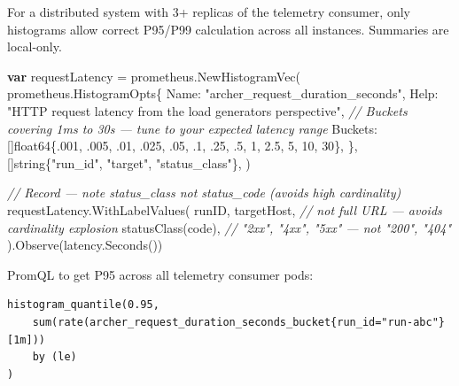 \documentclass[
]{article}
\newenvironment{Shaded}{}{}
\newcommand{\CommentTok}[1]{\textcolor[rgb]{0.38,0.63,0.69}{\textit{#1}}}
\newcommand{\DataTypeTok}[1]{\textcolor[rgb]{0.56,0.13,0.00}{#1}}
\newcommand{\DecValTok}[1]{\textcolor[rgb]{0.25,0.63,0.44}{#1}}
\newcommand{\FloatTok}[1]{\textcolor[rgb]{0.25,0.63,0.44}{#1}}
\newcommand{\KeywordTok}[1]{\textcolor[rgb]{0.00,0.44,0.13}{\textbf{#1}}}
\newcommand{\NormalTok}[1]{#1}
\newcommand{\OperatorTok}[1]{\textcolor[rgb]{0.40,0.40,0.40}{#1}}
\newcommand{\StringTok}[1]{\textcolor[rgb]{0.25,0.44,0.63}{#1}}
\begin{document}
For a distributed system with 3+ replicas of the telemetry consumer,
only histograms allow correct P95/P99 calculation across all instances.
Summaries are local-only.

\begin{Shaded}
\begin{Highlighting}[]
\KeywordTok{var}\NormalTok{ requestLatency }\OperatorTok{=}\NormalTok{ prometheus}\OperatorTok{.}\NormalTok{NewHistogramVec}\OperatorTok{(}
\NormalTok{    prometheus}\OperatorTok{.}\NormalTok{HistogramOpts}\OperatorTok{\{}
\NormalTok{        Name}\OperatorTok{:} \StringTok{"archer\_request\_duration\_seconds"}\OperatorTok{,}
\NormalTok{        Help}\OperatorTok{:} \StringTok{"HTTP request latency from the load generator\textquotesingle{}s perspective"}\OperatorTok{,}
        \CommentTok{// Buckets covering 1ms to 30s — tune to your expected latency range}
\NormalTok{        Buckets}\OperatorTok{:} \OperatorTok{[]}\DataTypeTok{float64}\OperatorTok{\{.}\DecValTok{001}\OperatorTok{,} \OperatorTok{.}\DecValTok{005}\OperatorTok{,} \OperatorTok{.}\DecValTok{01}\OperatorTok{,} \OperatorTok{.}\DecValTok{025}\OperatorTok{,} \OperatorTok{.}\DecValTok{05}\OperatorTok{,} \OperatorTok{.}\DecValTok{1}\OperatorTok{,} \OperatorTok{.}\DecValTok{25}\OperatorTok{,} \OperatorTok{.}\DecValTok{5}\OperatorTok{,} \DecValTok{1}\OperatorTok{,} \DecValTok{2}\FloatTok{.5}\OperatorTok{,} \DecValTok{5}\OperatorTok{,} \DecValTok{10}\OperatorTok{,} \DecValTok{30}\OperatorTok{\},}
    \OperatorTok{\},}
    \OperatorTok{[]}\DataTypeTok{string}\OperatorTok{\{}\StringTok{"run\_id"}\OperatorTok{,} \StringTok{"target"}\OperatorTok{,} \StringTok{"status\_class"}\OperatorTok{\},}
\OperatorTok{)}

\CommentTok{// Record — note status\_class not status\_code (avoids high cardinality)}
\NormalTok{requestLatency}\OperatorTok{.}\NormalTok{WithLabelValues}\OperatorTok{(}
\NormalTok{    runID}\OperatorTok{,}
\NormalTok{    targetHost}\OperatorTok{,}        \CommentTok{// not full URL — avoids cardinality explosion}
\NormalTok{    statusClass}\OperatorTok{(}\NormalTok{code}\OperatorTok{),} \CommentTok{// "2xx", "4xx", "5xx" — not "200", "404"}
\OperatorTok{).}\NormalTok{Observe}\OperatorTok{(}\NormalTok{latency}\OperatorTok{.}\NormalTok{Seconds}\OperatorTok{())}
\end{Highlighting}
\end{Shaded}

PromQL to get P95 across all telemetry consumer pods:

\begin{verbatim}
histogram_quantile(0.95,
    sum(rate(archer_request_duration_seconds_bucket{run_id="run-abc"}[1m]))
    by (le)
)
\end{verbatim}
\end{document}
